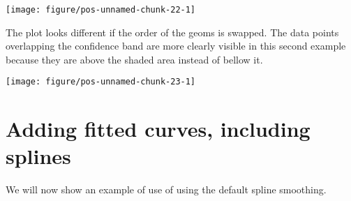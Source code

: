 \documentclass[paper=a4,10pt,div=17,headsepline,BCOR=12mm,twoside,open=right]{scrbook}\usepackage{knitr}
\begin{document}
\begin{knitrout}\footnotesize
{}\color{fgcolor}\begin{kframe}
\begin{alltt}
 \hlstd{(}  \hlstd{=} \hlopt{+}
  \hlstd{()} \hlopt{+} \hlstd{(}\hlstd{=}\hlstd{,} \hlstd{=}\hlstd{)}
\end{alltt}
\end{kframe}

{\centering \texttt{[image: figure/pos-unnamed-chunk-22-1]} 

}



\end{knitrout}

The plot looks different if the order of the geoms is swapped. The data points overlapping the confidence band are more clearly visible in this second example because they are above the shaded area instead of bellow it.

\begin{knitrout}\footnotesize
{}\color{fgcolor}\begin{kframe}
\begin{alltt}
 \hlstd{(}  \hlstd{=} \hlopt{+}
   \hlstd{(}\hlstd{=}\hlstd{,} \hlstd{=}\hlstd{)} \hlopt{+} \hlstd{()}
\end{alltt}
\end{kframe}

{\centering \texttt{[image: figure/pos-unnamed-chunk-23-1]} 

}



\end{knitrout}

\section{Adding fitted curves, including splines}

We will now show an example of use of  using the default spline smoothing.
\end{document}
